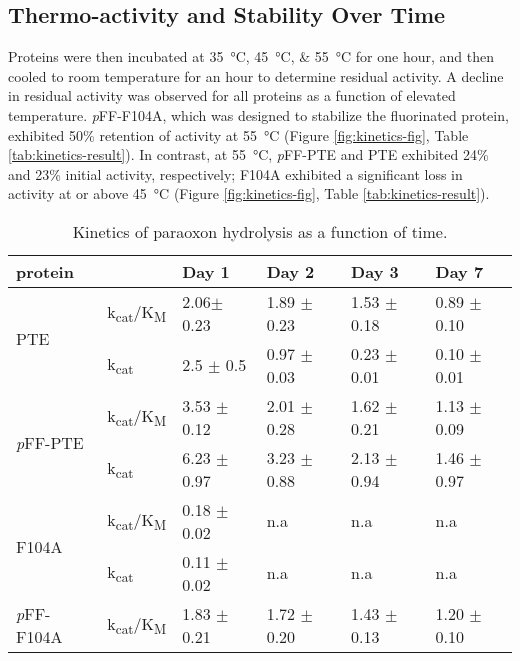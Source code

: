 \begin{refsection}
\subsection{Thermo-activity and Stability Over Time}
Proteins were then incubated at \SIlist{35;45;55}{\celsius} for one hour, and
then cooled to room temperature for an hour to determine residual activity. A
decline in residual activity was observed for all proteins as a function of
elevated temperature. \emph{p}FF-F104A, which was designed to stabilize the
fluorinated protein, exhibited 50\% retention of activity at \SI{55}{\celsius}
(Figure \ref{fig:kinetics-fig}, Table \ref{tab:kinetics-result}). In contrast,
at \SI{55}{\celsius}, \emph{p}FF-PTE and PTE exhibited 24\% and 23\% initial
activity, respectively; F104A exhibited a significant loss in activity at or
above \SI{45}{\celsius} (Figure \ref{fig:kinetics-fig}, Table
\ref{tab:kinetics-result}). 
\begin{table}[htbp]
\centering
    \caption[Kinetics of paraoxon hydrolysis as a function of time.]{Kinetics
    of paraoxon hydrolysis as a function of time.} \label{tab:kinetics-day-result} 
    \begin{tabular}{llllll}
    \hline
    protein                 &  & Day 1 & Day 2 & Day 3 & Day 7\\ 
    \hline
    \multirow{2}{*}{PTE}    & k\textsubscript{cat}/K\textsubscript{M} & 2.06$
    \pm$ 0.23 & 1.89 $\pm$ 0.23 & 1.53 $\pm$ 0.18 & 0.89 $\pm$ 0.10 \\
    
    & k\textsubscript{cat} & 2.5 $\pm$ 0.5 & 0.97 $\pm$ 0.03 & 0.23 $\pm$ 0.01 & 0.10
    $\pm$ 0.01 \\
    \multirow{2}{*}{\emph{p}FF-PTE}  & k\textsubscript{cat}/K\textsubscript{M} & 3.53
    $\pm$ 0.12 & 2.01 $\pm$ 0.28 & 1.62 $\pm$ 0.21 & 1.13 $\pm$ 0.09 \\ 
    
    & k\textsubscript{cat} & 6.23 $\pm$ 0.97 & 3.23 $\pm$ 0.88 & 2.13 $\pm$ 0.94 &
    1.46 $\pm$ 0.97 \\
    \multirow{2}{*}{F104A} & k\textsubscript{cat}/K\textsubscript{M} &
    0.18 $\pm$ 0.02 & n.a & n.a & n.a \\ 
    
    & k\textsubscript{cat} & 0.11 $\pm$ 0.02 & n.a & n.a & n.a \\
    \multirow{2}{*}{\emph{p}FF-F104A} & k\textsubscript{cat}/K\textsubscript{M}
    & 1.83 $\pm$ 0.21 & 1.72 $\pm$ 0.20 & 1.43 $\pm$ 0.13 & 1.20 $\pm$ 0.10 \\


\end{tabular}
\end{table}
\end{refsection}
